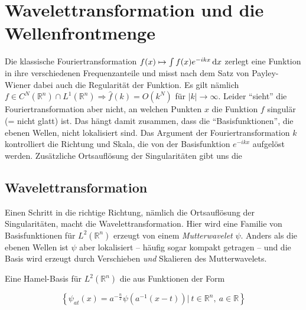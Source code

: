 \section{Wavelettransformation und die Wellenfrontmenge} %
\label{sec:shearlets}

Die klassische Fouriertransformation $f(x) \mapsto \int f(x) e^{-ik x} \mathop{}\!\mathrm{d} x$
zerlegt eine Funktion in ihre verschiedenen Frequenzanteile und misst nach dem Satz von Payley-Wiener dabei auch die Regularität der Funktion. Es gilt nämlich $f \in C^N(\mathbb{R}^n) \cap L^1(\mathbb{R}^n) \Rightarrow \hat f(k) = O(k^N) $ für $|k| \to \infty$. Leider "`sieht"' die Fouriertransformation aber nicht, an welchen Punkten $x$ die Funktion $f$ singulär (= nicht glatt) ist. Das hängt damit zusammen, dass die "`Basisfunktionen"', die ebenen Wellen, nicht lokalisiert sind. Das Argument der Fouriertransformation $k$ kontrolliert die Richtung und Skala, die von der Basisfunktion $e^{-ikx}$ aufgelöst werden. Zusätzliche Ortsauflösung der Singularitäten gibt uns die


\subsection{Wavelettransformation} %
\label{sec:wavelettransformation}


Einen Schritt in die richtige Richtung, nämlich die Ortsauflösung der Singularitäten, macht die Wavelettransformation. Hier wird eine Familie von Basisfunktionen für $L^2(\mathbb{R}^n)$ erzeugt von einem \textit{Mutterwavelet} $\psi$. Anders als die ebenen Wellen ist $\psi$ aber lokalisiert -- häufig sogar kompakt getragen -- und die Basis wird erzeugt durch Verschieben \emph{und} Skalieren des Mutterwavelets.

Eine Hamel-Basis für $L^2(\mathbb{R}^n)$ die aus Funktionen der Form

\begin{equation*}
    \left\{\psi_{at}(x) = a^{-\frac{n}{2}}\psi\left(a^{-1}(x-t)\right)  |~ t \in \mathbb{R}^n,  ~a \in \mathbb{R}\right\}
\end{equation*}

